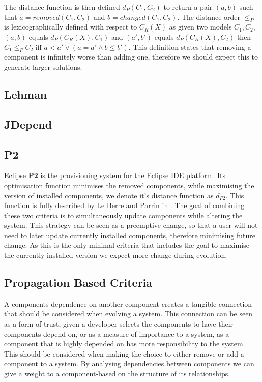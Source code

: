 The distance function is then defined $d_P(C_1,C_2)$ to return a pair $(a,b)$ such that $a = removed(C_1,C_2)$ and $b = changed(C_1,C_2)$.
The distance order $\leq_{P}$ is lexicographically defined with respect to $C_R(X)$ as given two models $C_1,C_2$,
$(a,b)$ equals $d_P(C_R(X),C_1)$ and $(a',b')$ equals $d_P(C_R(X),C_2)$ then
$C_1 \leq_{P} C_2 $ iff $a < a' \vee (a = a' \wedge b \leq b')$.
This definition states that removing a component is infinitely worse than adding one, 
therefore we should expect this to generate larger solutions.

\subsection{Lehman}

\subsection{JDepend}


\subsection{P2}
Eclipse \textbf{P2} \cite{le_berre_dependency_2009,leBerre2010} is the provisioning system for the Eclipse IDE platform.
Its optimisation function minimises the removed components, while maximising the version of installed components, 
we denote it's distance function as $d_{P2}$.
This function is fully described by Le Berre and Parrin in \cite{leBerre2010}.
The goal of combining these two criteria is to simultaneously update components while altering the system.
This strategy can be seen as a preemptive change, so that a user will not need to later update currently installed components,
therefore minimising future change.
As this is the only minimal criteria that includes the goal to maximise the currently installed version 
we expect more change during evolution.

\subsection{Propagation Based Criteria}
{}A components dependence on another component creates a tangible connection that should be considered when evolving a system.
{}This connection can be seen as a form of trust, given a developer selects the components to have their components depend on,
{}or as a measure of importance to a system, as a component that is highly depended on has more responsibility to the system.
{}This should be considered when making the choice to either remove or add a component to a system.
{}By analysing dependencies between components we can give a weight to a component-based on the structure of its relationships.

